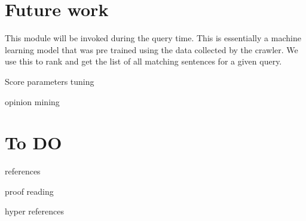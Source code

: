 \documentclass{article}
\begin{document}
\section{Future work}
\begin{description}
  \item[NLP module:] This module will be invoked during the query time.  This is essentially a machine learning model that was pre trained using the data collected by the crawler.  We use this to rank and get the list of all matching sentences for a given query.
 \item Score parameters tuning
 \item opinion mining
\end{description}

\section{To DO}
\begin{description}
\item references
\item proof reading
\item hyper references

\end{description}
\end{document}
